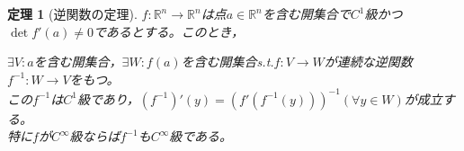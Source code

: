 \documentclass[dvipdfmx,a4j,10pt]{jsarticle}
\theoremstyle{mystyle1}
\newtheorem{thm}[dfn]{定理}
\theoremstyle{mystyle2}
\begin{document}

\newpage

\begin{framed}
	\begin{thm}[逆関数の定理]\label{th2.11}
$f:\mathbb{R}^n\to\mathbb{R}^n$は点$a\in\mathbb{R}^n$を含む開集合で$C^1$級かつ$\det f'(a)\neq 0$\footnotemark であるとする。このとき，

		$\exists V:a$を含む開集合，$\exists W:f(a)$を含む開集合s.t.$f:V\to W$が連続な逆関数$f^{-1}:W\to V$をもつ。\\
		この$f^{-1}$は$C^1$級であり，$(f^{-1})'(y)=(f'(f^{-1}(y)))^{-1}(\forall y\in W)$が成立する。\\
		特に$f$が$C^\infty$級ならば$f^{-1}$も$C^\infty$級である。
	\end{thm}
\end{framed}

\end{document}
